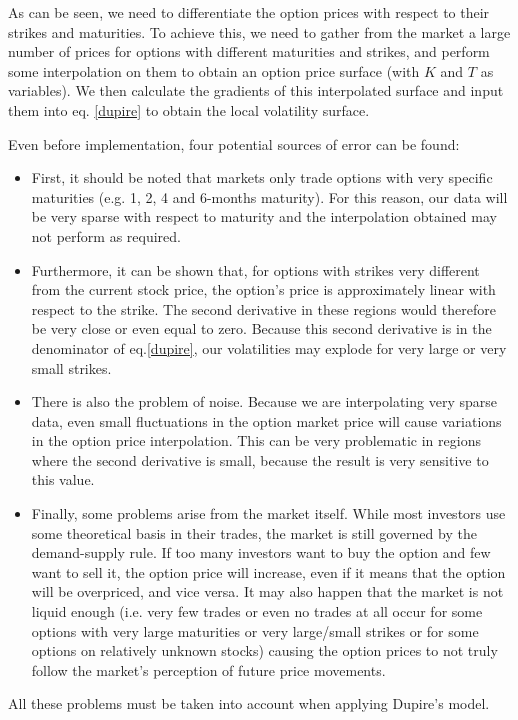 As can be seen, we need to differentiate the option prices with respect to their strikes and maturities. To achieve this, we need to gather from the market a large number of prices for options with different maturities and strikes, and perform some interpolation on them to obtain an option price surface (with $K$ and $T$ as variables). We then calculate the gradients of this interpolated surface and input them into eq. \ref{dupire} to obtain the local volatility surface.

Even before implementation, four potential sources of error can be found:
\begin{itemize}
\item First, it should be noted that markets only trade options with very specific maturities (e.g. 1, 2, 4 and 6-months maturity). For this reason, our data will be very sparse with respect to maturity and the interpolation obtained may not perform as required.
\item Furthermore, it can be shown that, for options with strikes very different from the current stock price, the option's price is approximately linear with respect to the strike. The second derivative in these regions would therefore be very close or even equal to zero. Because this second derivative is in the denominator of eq.\eqref{dupire}, our volatilities may explode for very large or very small strikes.
\item There is also the problem of noise. Because we are interpolating very sparse data, even small fluctuations in the option market price will cause variations in the option price interpolation. This can be very problematic in regions where the second derivative is small, because the result is very sensitive to this value.
\item Finally, some problems arise from the market itself. While most investors use some theoretical basis in their trades, the market is still governed by the demand-supply rule. If too many investors want to buy the option and few want to sell it, the option price will increase, even if it means that the option will be overpriced, and vice versa. It may also happen that the market is not liquid enough (i.e. very few trades or even no trades at all occur for some options with very large maturities or very large/small strikes or for some options on relatively unknown stocks) causing the option prices to not truly follow the market's perception of future price movements.
\end{itemize}
All these problems must be taken into account when applying Dupire's model.

